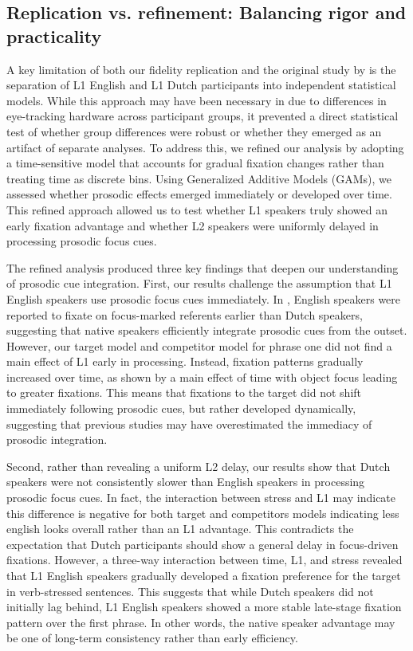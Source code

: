 \subsection{Replication vs. refinement: Balancing rigor and practicality}

A key limitation of both our fidelity replication and the original study by \citep{Ge2021} is the separation of L1 English and L1 Dutch participants into independent statistical models. While this approach may have been necessary in \citep{Ge2021} due to differences in eye-tracking hardware across participant groups, it prevented a direct statistical test of whether group differences were robust or whether they emerged as an artifact of separate analyses. To address this, we refined our analysis by adopting a time-sensitive model that accounts for gradual fixation changes rather than treating time as discrete bins. Using Generalized Additive Models (GAMs), we assessed whether prosodic effects emerged immediately or developed over time. This refined approach allowed us to test whether L1 speakers truly showed an early fixation advantage and whether L2 speakers were uniformly delayed in processing prosodic focus cues.

The refined analysis produced three key findings that deepen our understanding of prosodic cue integration. First, our results challenge the assumption that L1 English speakers use prosodic focus cues immediately. In \citep{Ge2021}, English speakers were reported to fixate on focus-marked referents earlier than Dutch speakers, suggesting that native speakers efficiently integrate prosodic cues from the outset. However, our target model and competitor model for phrase one did not find a main effect of L1 early in processing. Instead, fixation patterns gradually increased over time, as shown by a main effect of time with object focus leading to greater fixations. This means that fixations to the target did not shift immediately following prosodic cues, but rather developed dynamically, suggesting that previous studies may have overestimated the immediacy of prosodic integration.

Second, rather than revealing a uniform L2 delay, our results show that Dutch speakers were not consistently slower than English speakers in processing prosodic focus cues. In fact, the interaction between stress and L1 may indicate this difference is negative for both target and competitors models indicating less english looks overall rather than an L1 advantage. This contradicts the expectation that Dutch participants should show a general delay in focus-driven fixations. However, a three-way interaction between time, L1, and stress revealed that L1 English speakers gradually developed a fixation preference for the target in verb-stressed sentences. This suggests that while Dutch speakers did not initially lag behind, L1 English speakers showed a more stable late-stage fixation pattern over the first phrase. In other words, the native speaker advantage may be one of long-term consistency rather than early efficiency.

